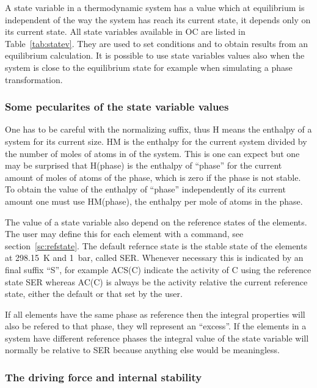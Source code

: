 \documentclass[11pt]{article}
\begin{document}
A state variable in a thermodynamic system has a value which at
equilibrium is independent of the way the system has reach its current
state, it depends only on its current state.  All state variables
available in OC are listed in Table~\ref{tab:statev}.  They are used
to set conditions and to obtain results from an equilibrium
calculation.  It is possible to use state variables values also when
the system is close to the equilibrium state for example when
simulating a phase transformation.

\subsubsection{Some pecularites of the state variable values}

One has to be careful with the normalizing suffix, thus H means the
enthalpy of a system for its current size.  HM is the enthalpy for the
current system divided by the number of moles of atoms in of the
system.  This is one can expect but one may be surprised that H(phase)
is the enthalpy of ``phase'' for the current amount of moles of atoms
of the phase, which is zero if the phase is not stable.  To obtain the
value of the enthalpy of ``phase'' independently of its current amount
one must use HM(phase), the enthalpy per mole of atoms in the phase.

The value of a state variable also depend on the reference states of
the elements.  The user may define this for each element with a
command, see section~\ref{sc:refstate}.  The default refernce state is
the stable state of the elements at 298.15~K and 1~bar, called SER.
Whenever necessary this is indicated by an final suffix ``S'', for
example ACS(C) indicate the activity of C using the reference state
SER whereas AC(C) is always be the activity relative the current
reference state, either the default or that set by the user.

If all elements have the same phase as reference then the integral
properties will also be refered to that phase, they wll represent an
``excess''.  If the elements in a system have different reference
phases the integral value of the state variable will normally be
relative to SER because anything else would be meaningless.

\hypertarget{Info dgm}{}
\subsubsection{The driving force and internal stability}\label{sc:dgm}
\end{document}
